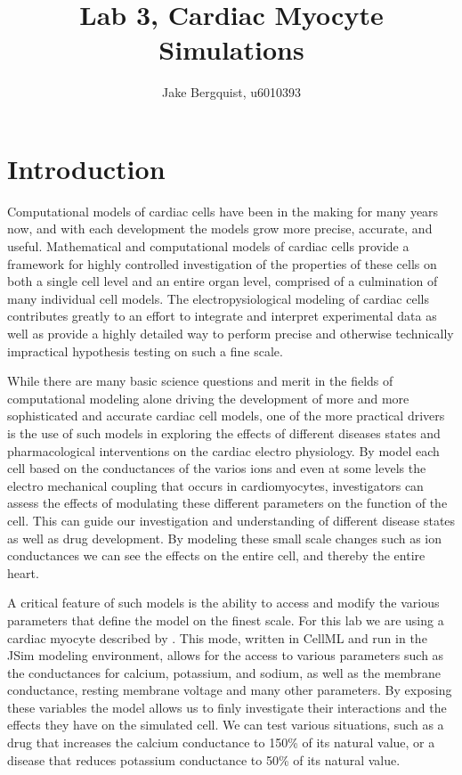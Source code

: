 \documentclass[11pt]{article}
\begin{document}
\title{Lab 3, Cardiac Myocyte Simulations}
\author{Jake Bergquist, u6010393}
\maketitle
\tableofcontents
\newpage

\section{Introduction}
\par{}
Computational models of cardiac cells have been in the making for many years now, and with each development the models grow more precise, accurate, and useful.\cite{Fink2011} Mathematical and computational models of cardiac cells provide a framework for highly controlled investigation of the properties of these cells on both a single cell level and an entire organ level, comprised of a culmination of many individual cell models.  The electropysiological modeling of cardiac cells contributes greatly to an effort to integrate and interpret experimental data as well as provide a highly detailed way to perform precise and otherwise technically impractical hypothesis testing on such a fine scale.
\par{}
While there are many basic science questions and merit in the fields of computational modeling alone driving the development of more and more sophisticated and accurate cardiac cell models, one of the more practical drivers is the use of such models in exploring the effects of different diseases states and pharmacological interventions on the cardiac electro physiology. By model each cell based on the conductances of the varios ions and even at some levels the electro mechanical coupling that occurs in cardiomyocytes, investigators can assess the effects of modulating these different parameters on the function of the cell. This can guide our investigation and understanding of different disease states as well as drug development. By modeling these small scale changes such as ion conductances we can see the effects on the entire cell, and thereby the entire heart.\cite{Fink2011}
\par{}
A critical feature of such models is the ability to access and modify the various parameters that define the model on the finest scale. For this lab we are using a cardiac myocyte described by \cite{TenTusscher2003}. This mode, written in CellML and run in the JSim modeling environment, allows for the access to various parameters such as the conductances for calcium, potassium, and sodium, as well as the membrane conductance, resting membrane voltage and many other parameters. By exposing these variables the model allows us to finly investigate their interactions and the effects they have on the simulated cell. We can test various situations, such as a drug that increases the calcium conductance to 150\% of its natural value, or a disease that reduces potassium conductance to 50\% of its natural value.
\end{document}
